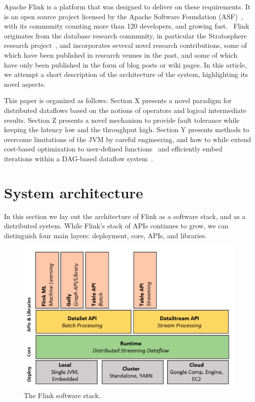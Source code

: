 \documentclass[11pt]{article}
\begin{document}
Apache Flink is a platform that was designed to deliver on these requirements. It is an open source project licensed by the Apache Software Foundation (ASF)~\cite{CUSTOM:web/Apache}, with its community counting more than 120 developers, and growing fast.~\cite{CUSTOM:web/FlinkContrib} Flink originates from the database research community, in particular the Stratosphere research project~\cite{stratosphere}, and incorporates several novel research contributions, some of which have been published in research venues in the past, and some of which have only been published in the form of blog posts or wiki pages. In this article, we attempt a short description of the architecture of the system, highlighting its novel aspects.

This paper is organized as follows: Section X presents a novel paradigm for distributed dataflows based on the notions of operators and logical intermediate results. Section Z presents a novel mechanism to provide fault tolerance while keeping the latency low and the throughput high. Section Y presents methods to overcome limitations of the JVM by careful engineering, and how to while extend cost-based optimization to user-defined functions~\cite{battre2010nephele, DBLP:journals/pvldb/EwenTKM12} and efficiently embed iterations within a DAG-based dataflow system~\cite{DBLP:journals/pvldb/EwenTKM12}. 


\section{System architecture}

In this section we lay out the architecture of Flink as a software stack, and as a distributed system. While Flink's stack of APIs continues to grow, we can distinguish four main layers: deployment, core, APIs, and libraries.

\begin{figure}[h!]
	\centering  	
  	\includegraphics[width=.45\textwidth]{figs/flink_stack.png}
	\caption{The Flink software stack.}
	\label{fig:FlinkStack}
\end{figure}
\end{document}
